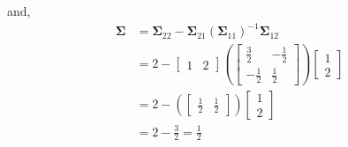 \documentclass[12pt]{article}\usepackage[]{graphicx}\usepackage[]{color}
\newenvironment{problem}[2][Problem]{\begin{trivlist}
\item[\hskip \labelsep {\bfseries #1}\hskip \labelsep {\bfseries #2.}]}{\end{trivlist}}
\newcommand{\vct}{\mathbf}
\begin{document}
\begin{enumerate}[a)]
and,
\begin{align*}
\vct{\Sigma} &= \vct{\Sigma}_{22} - \vct{\Sigma}_{21}\left(\vct{\Sigma}_{11}\right)^{-1}\vct{\Sigma}_{12}\\
&= 2 - \begin{bmatrix} 1 & 2 \end{bmatrix}\left(\begin{bmatrix} \frac{3}{2} & -\frac{1}{2} \\ -\frac{1}{2} & \frac{1}{2} \end{bmatrix} \right) \begin{bmatrix} 1 \\ 2 \end{bmatrix}\\
&= 2 - \left(\begin{bmatrix} \frac{1}{2} & \frac{1}{2} \end{bmatrix}\right) \begin{bmatrix} 1 \\ 2 \end{bmatrix}\\
&= 2 - \frac{3}{2} = \frac{1}{2}
\end{align*}


\end{enumerate}


\begin{problem}{4.6}
\end{problem}
\end{document}
